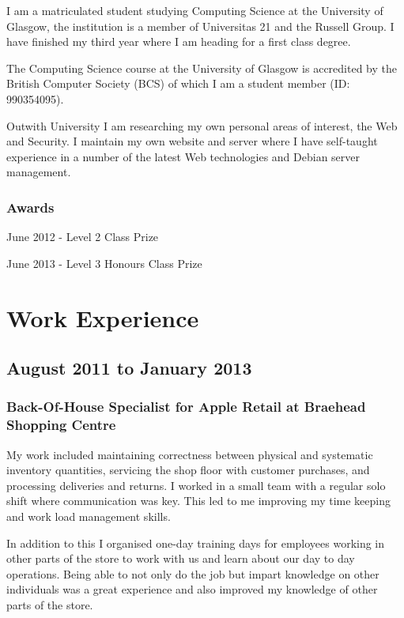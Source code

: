 \documentclass[11pt,a4paper]{article}
\begin{document}
I am a matriculated student studying Computing Science at the University of
Glasgow, the institution is a member of Universitas 21 and the Russell Group.
I have finished my third year where I am heading for a first class degree.

The Computing Science course at the University of Glasgow is accredited by the
British Computer Society (BCS) of which I am a student member (ID: 990354095).

Outwith University I am researching my own personal areas of interest, the
Web and Security. I maintain my own website and server where I have self-taught
experience in a number of the latest Web technologies and Debian server
management.

\subsubsection*{Awards}

June 2012 - Level 2 Class Prize

June 2013 - Level 3 Honours Class Prize

\section*{Work Experience}

\subsection*{August 2011 to January 2013}

\subsubsection*{Back-Of-House Specialist for Apple Retail at Braehead
Shopping Centre}

My work included maintaining correctness between physical and systematic
inventory quantities, servicing the shop floor with customer purchases, and
processing deliveries and returns. I worked in a small team with a regular
solo shift where communication was key. This led to me improving my time
keeping and work load management skills.

In addition to this I organised one-day training days for employees working in
other parts of the store to work with us and learn about our day to day
operations. Being able to not only do the job but impart knowledge on other
individuals was a great experience and also improved my knowledge of other
parts of the store.
\end{document}
